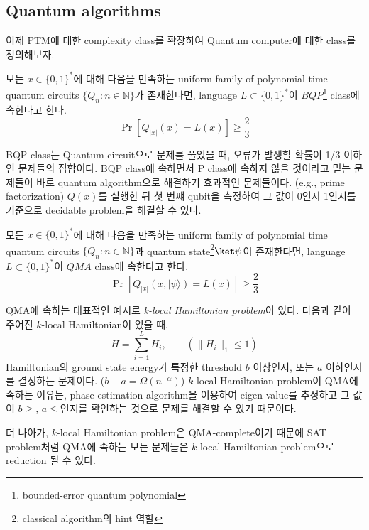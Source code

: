 \subsection{Quantum algorithms}
이제 PTM에 대한 complexity class를 확장하여 Quantum computer에 대한 class를 정의해보자.
\begin{definition}\label{def:BQP}
    모든 $x \in \{0, 1\}^*$에 대해 다음을 만족하는  uniform family of polynomial time quantum circuits $\{Q_n : n \in \mathbb N\}$가 존재한다면, language $L \subset \{0, 1\}^*$이 $BQP$\footnote{bounded-error quantum polynomial} class에 속한다고 한다.
    $$ \operatorname{Pr}\left[Q_{|x|}(x)=L(x)\right] \geq \frac{2}{3} $$
\end{definition}

BQP class는 Quantum circuit으로 문제를 풀었을 때, 오류가 발생할 확률이 1/3 이하인 문제들의 집합이다. BQP class에 속하면서 P class에 속하지 않을 것이라고 믿는 문제들이 바로 quantum algorithm으로 해결하기 효과적인 문제들이다. (e.g., prime factorization) $Q(x)$를 실행한 뒤 첫 번쨰 qubit을 측정하여 그 값이 0인지 1인지를 기준으로 decidable problem을 해결할 수 있다.

\begin{definition}\label{def:QMA}
    모든 $x \in \{0, 1\}^*$에 대해 다음을 만족하는  uniform family of polynomial time quantum circuits $\{Q_n : n \in \mathbb N\}$과 quantum state\footnote{classical algorithm의 hint 역할}$\ket \psi$이 존재한다면, language $L \subset \{0, 1\}^*$이 $QMA$ class에 속한다고 한다.
    $$ \operatorname{Pr}\left[Q_{|x|}(x,|\psi\rangle)=L(x)\right] \geq \frac{2}{3} $$
\end{definition}

QMA에 속하는 대표적인 예시로 \textit{k-local Hamiltonian problem}이 있다. 다음과 같이 주어진 $k$-local Hamiltonian이 있을 때,
\begin{equation*}
    H = \sum^L_{i=1} H_i, \qquad (\|H_i\|_1 \le 1)
\end{equation*}
Hamiltonian의 ground state energy가 특정한 threshold $b$ 이상인지, 또는 $a$ 이하인지를 결정하는 문제이다. ($b-a=\Omega\left(n^{-\alpha}\right)$) $k$-local Hamiltonian problem이 QMA에 속하는 이유는, phase estimation algorithm을 이용하여 eigen-value를 추정하고 그 값이 $b \ge$, $a \le$인지를 확인하는 것으로 문제를 해결할 수 있기 때문이다.

더 나아가, $k$-local Hamiltonian problem은 QMA-complete이기 때문에 SAT problem처럼 QMA에 속하는 모든 문제들은 $k$-local Hamiltonian problem으로 reduction 될 수 있다.
\vspace{-0.5em}
